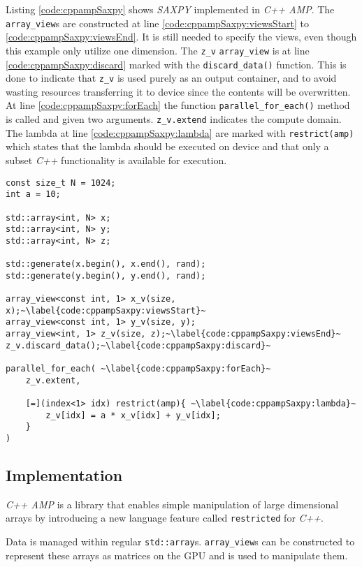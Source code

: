 Listing \ref{code:cppampSaxpy} shows \textit{SAXPY} implemented in \textit{C++ AMP}. The \texttt{array\_view}s are constructed at line \ref{code:cppampSaxpy:viewsStart} to \ref{code:cppampSaxpy:viewsEnd}. It is still needed to specify the views, even though this example only utilize one dimension. The \texttt{z\_v} \texttt{array\_view} is at line \ref{code:cppampSaxpy:discard} marked with the \texttt{discard\_data()} function. This is done to indicate that \texttt{z\_v} is used purely as an output container, and to avoid wasting resources transferring it to device since the contents will be overwritten.
At line \ref{code:cppampSaxpy:forEach} the function \texttt{parallel\_for\_each()} method is called and given two arguments. \texttt{z\_v.extend} indicates the compute domain. The lambda at line \ref{code:cppampSaxpy:lambda} are marked with \texttt{restrict(amp)} which states that the lambda should be executed on device and that only a subset \textit{C++} functionality is available for execution.
\begin{lstlisting}[caption={\textit{C++ AMP} \textit{SAXPY} example.}, label={code:cppampSaxpy}]
const size_t N = 1024;
int a = 10;

std::array<int, N> x;
std::array<int, N> y;
std::array<int, N> z;

std::generate(x.begin(), x.end(), rand);
std::generate(y.begin(), y.end(), rand);

array_view<const int, 1> x_v(size, x);~\label{code:cppampSaxpy:viewsStart}~
array_view<const int, 1> y_v(size, y);
array_view<int, 1> z_v(size, z);~\label{code:cppampSaxpy:viewsEnd}~
z_v.discard_data();~\label{code:cppampSaxpy:discard}~

parallel_for_each( ~\label{code:cppampSaxpy:forEach}~
    z_v.extent,

    [=](index<1> idx) restrict(amp){ ~\label{code:cppampSaxpy:lambda}~
        z_v[idx] = a * x_v[idx] + y_v[idx];
    }
)
\end{lstlisting}

\subsection{Implementation}

\textit{C++ AMP} is a library that enables simple manipulation of large dimensional arrays by introducing a new language feature called \texttt{restricted} for \textit{C++}. 

Data is managed within regular \texttt{std::array}s. \texttt{array\_view}s can be constructed to represent these arrays as matrices on the GPU and is used to manipulate them.

